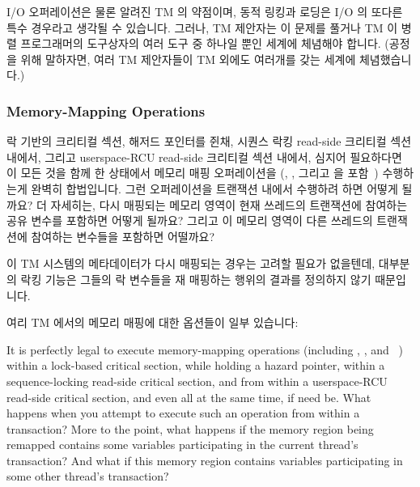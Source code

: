 I/O 오퍼레이션은 물론 알려진 TM 의 약점이며, 동적 링킹과 로딩은 I/O 의 또다른
특수 경우라고 생각될 수 있습니다.
그러나, TM 제안자는 이 문제를 풀거나 TM 이 병렬 프로그래머의 도구상자의 여러
도구 중 하나일 뿐인 세계에 체념해야 합니다.
(공정을 위해 말하자면, 여러 TM 제안자들이 TM 외에도 여러개를 갖는 세계에
체념했습니다.)

\subsubsection{Memory-Mapping Operations}
\label{sec:future:Memory-Mapping Operations}

락 기반의 크리티컬 섹션, 해저드 포인터를 쥔채, 시퀀스 락킹 read-side 크리티컬
섹션 내에서, 그리고 userspace-RCU read-side 크리티컬 섹션 내에서, 심지어
필요하다면 이 모든 것을 함께 한 상태에서 메모리 매핑 오퍼레이션을 (,
, 그리고  을 포함~\cite{TheOpenGroup1997SUS})
수행하는게 완벽히 합법입니다.
그런 오퍼레이션을 트랜잭션 내에서 수행하려 하면 어떻게 될까요?
더 자세히는, 다시 매핑되는 메모리 영역이 현재 쓰레드의 트랜잭션에 참여하는 공유
변수를 포함하면 어떻게 될까요?
그리고 이 메모리 영역이 다른 쓰레드의 트랜잭션에 참여하는 변수들을 포함하면
어떨까요?

이 TM 시스템의 메타데이터가 다시 매핑되는 경우는 고려할 필요가 없을텐데,
대부분의 락킹 기능은 그들의 락 변수들을 재 매핑하는 행위의 결과를 정의하지 않기
때문입니다.

여리 TM 에서의 메모리 매핑에 대한 옵션들이 일부 있습니다:

\iffalse

It is perfectly legal to execute memory-mapping operations (including
, , and ~\cite{TheOpenGroup1997SUS})
within a lock-based critical section, while holding a hazard pointer,
within a sequence-locking read-side critical section, and from within a
userspace-RCU read-side critical section, and even all at the same time,
if need be.
What happens when you attempt to execute such an operation from within
a transaction?
More to the point, what happens if the memory region being remapped
contains some variables participating in the current thread's transaction?
And what if this memory region contains variables participating in some
other thread's transaction?

